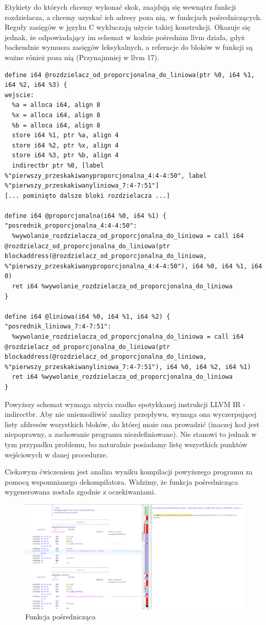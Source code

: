 Etykiety do których chcemy wykonać skok, znajdują się wewnątrz funkcji rozdzielacza, a chcemy uzyskać ich adresy poza nią,  w funkcjach pośredniczących. Reguły zasięgów w języku C wykluczają użycie takiej konstrukcji. Okazuje się jednak, że odpowiadający im schemat w kodzie pośrednim llvm działa, gdyż backendnie wymusza zasięgów leksykalnych, a referncje do bloków w funkcji są ważne rónież poza nią (Przynajmniej w llvm 17).
\begin{lstlisting}
define i64 @rozdzielacz_od_proporcjonalna_do_liniowa(ptr %0, i64 %1, i64 %2, i64 %3) {
wejscie:
  %a = alloca i64, align 8
  %x = alloca i64, align 8
  %b = alloca i64, align 8
  store i64 %1, ptr %a, align 4
  store i64 %2, ptr %x, align 4
  store i64 %3, ptr %b, align 4
  indirectbr ptr %0, [label %"pierwszy_przeskakiwanyproporcjonalna_4:4-4:50", label %"pierwszy_przeskakiwanyliniowa_7:4-7:51"]
[... pominięto dalsze bloki rozdzielacza ...]

define i64 @proporcjonalna(i64 %0, i64 %1) {
"posrednik_proporcjonalna_4:4-4:50":
  %wywolanie_rozdzielacza_od_proporcjonalna_do_liniowa = call i64 @rozdzielacz_od_proporcjonalna_do_liniowa(ptr blockaddress(@rozdzielacz_od_proporcjonalna_do_liniowa, %"pierwszy_przeskakiwanyproporcjonalna_4:4-4:50"), i64 %0, i64 %1, i64 0)
  ret i64 %wywolanie_rozdzielacza_od_proporcjonalna_do_liniowa
}

define i64 @liniowa(i64 %0, i64 %1, i64 %2) {
"posrednik_liniowa_7:4-7:51":
  %wywolanie_rozdzielacza_od_proporcjonalna_do_liniowa = call i64 @rozdzielacz_od_proporcjonalna_do_liniowa(ptr blockaddress(@rozdzielacz_od_proporcjonalna_do_liniowa, %"pierwszy_przeskakiwanyliniowa_7:4-7:51"), i64 %0, i64 %2, i64 %1)
  ret i64 %wywolanie_rozdzielacza_od_proporcjonalna_do_liniowa
}
\end{lstlisting}
Powyższy schemat wymaga użycia rzadko spotykkanej instrukcji LLVM IR - indirectbr. Aby nie uniemożliwić analizy przepływu, wymaga ona wyczerpującej listy afdresów wszystkich bloków, do której może ona prowadzić (inaczej kod jest niepoprawny, a zachowanie programu niezdefiniowane). Nie stanowi to jednak w tym przypadku problemu, bo naturalnie posiadamy listę wszystkich punktów wejściowych w danej procedurze.

Ciekawym ćwiczeniem jest analiza wyniku kompilacji powyższego programu za pomocą wspomnianego dekompilatora.
Widzimy, że funkcja pośrednicząca wygenerowana została zgodnie z oczekiwaniami.
\begin{figure}[H]
    \centering
    \includegraphics[width=1.2\textwidth]{images/2.rozdzielacz/1.png}
    \caption{Funkcja pośrednicząca}
\end{figure}
\FloatBarrier

